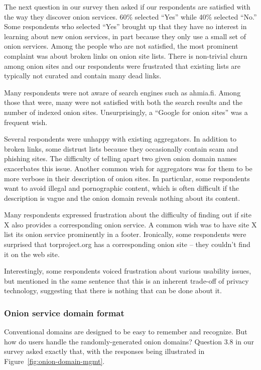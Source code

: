 The next question in our survey then asked if our respondents are satisfied with
the way they discover onion services.  60\% selected ``Yes'' while 40\% selected
``No.'' Some respondents who selected ``Yes'' brought up that they have no
interest in learning about new onion services, in part because they only use a
small set of onion services.  Among the people who are not satisfied, the most
prominent complaint was about broken links on onion site lists.  There is
non-trivial churn among onion sites and our respondents were frustrated that
existing lists are typically not curated and contain many dead links.

Many respondents were not aware of search engines such as ahmia.fi.  Among those
that were, many were not satisfied with both the search results and the number
of indexed onion sites.  Unsurprisingly, a ``Google for onion sites'' was a
frequent wish.

Several respondents were unhappy with existing aggregators.  In addition to
broken links, some distrust lists because they occasionally contain scam and
phishing sites.  The difficulty of telling apart two given onion domain names
exacerbates this issue.  Another common wish for aggregators was for them to be
more verbose in their description of onion sites.  In particular, some
respondents want to avoid illegal and pornographic content, which is often
difficult if the description is vague and the onion domain reveals nothing about
its content.

Many respondents expressed frustration about the difficulty of finding out if
site X also provides a corresponding onion service.  A common wish was to have
site X list its onion service prominently in a footer.  Ironically, some
respondents were surprised that torproject.org has a corresponding onion site --
they couldn't find it on the web site.

Interestingly, some respondents voiced frustration about various usability
issues, but mentioned in the same sentence that this is an inherent trade-off of
privacy technology, suggesting that there is nothing that can be done about it.

\subsubsection{Onion service domain format}

Conventional domains are designed to be easy to remember and recognize.  But how do users
handle the randomly-generated onion domains?  Question 3.8 in our survey asked
exactly that, with the responses being illustrated in
Figure~\ref{fig:onion-domain-mgmt}.

